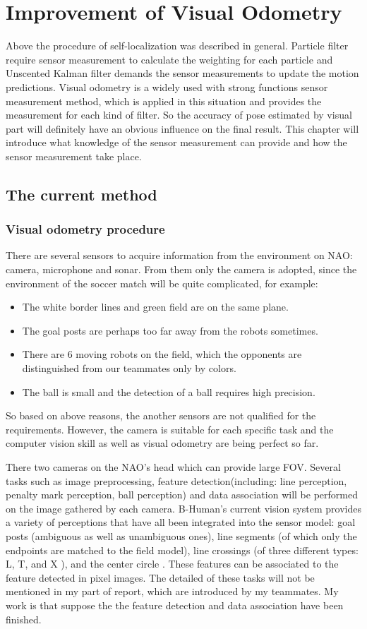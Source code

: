 \chapter{Improvement of Visual Odometry}\label{Chap:Imp}
Above the procedure of self-localization was described in general. Particle filter require sensor measurement to calculate the weighting for each particle and Unscented Kalman filter demands the sensor measurements to update the motion predictions. Visual odometry is a widely used with strong functions sensor measurement method, which is applied in this situation and provides the measurement for each kind of filter. So the accuracy of pose estimated by visual part will definitely have an obvious influence on the final result. This chapter will introduce what knowledge of the sensor measurement can provide and how the sensor measurement take place. 
\section{The current method}
\subsection{Visual odometry procedure}
There are several sensors to acquire information from the environment on NAO: camera, microphone and sonar. From them only the camera is adopted, since the environment of the soccer match will be quite complicated, for example:
\begin{itemize}
    \item The white border lines and green field are on the same plane.
    \item The goal posts are perhaps too far away from the robots sometimes.
    \item There are 6 moving robots on the field, which the opponents are distinguished from our teammates only by colors.
    \item The ball is small and the detection of a ball requires high precision.
\end{itemize}
So based on above reasons, the another sensors are not qualified for the requirements. However, the camera is suitable for each specific task and the computer vision skill as well as visual odometry are being perfect so far.

There two cameras on the NAO's head which can provide large FOV. Several tasks such as image preprocessing, feature detection(including: line perception, penalty mark perception, ball perception) and data association will be performed on the image gathered by each camera. B-Human's current vision system provides a variety of perceptions that have all been integrated into the sensor model: goal posts (ambiguous as well as unambiguous ones), line segments (of which only the endpoints are matched to the field model), line crossings (of three different types: L, T, and X ), and the center circle \cite{BHumanCodeRelease2012}. These features can be associated to the feature detected in pixel images. The detailed of these tasks will not be mentioned in my part of report, which are introduced by my teammates. My work is that suppose the the feature detection and data association have been finished.

